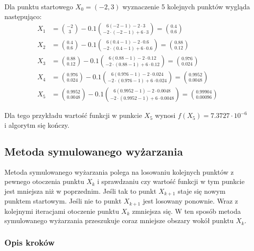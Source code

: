 \documentclass{article}
\begin{document}
Dla punktu startowego $X_0 = (-2, 3)$
wyznaczenie 5 kolejnych punktów wygląda następująco:
\begin{equation*}
    \begin{aligned}
    X_1 &= {{-2} \choose {3}} - 0.1 {6(-2 - 1)-2\cdot3 \choose -2\cdot(-2-1)+6\cdot3} = {{0.4} \choose {0.6}} \\
    X_2 &= {{0.4} \choose {0.6}} - 0.1 {6(0.4 - 1)-2\cdot0.6 \choose -2\cdot(0.4-1)+6\cdot0.6} = {{0.88} \choose {0.12}} \\
    X_3 &= {{0.88} \choose {0.12}} - 0.1 {6(0.88 - 1)-2\cdot0.12 \choose -2\cdot(0.88-1)+6\cdot0.12} = {{0.976} \choose {0.024}} \\
    X_4 &= {{0.976} \choose {0.024}} - 0.1 {6(0.976 - 1)-2\cdot0.024 \choose -2\cdot(0.976-1)+6\cdot0.024} = {{0.9952} \choose {0.0048}} \\
    X_5 &= {{0.9952} \choose {0.0048}} - 0.1 {6(0.9952 - 1)-2\cdot0.0048 \choose -2\cdot(0.9952-1)+6\cdot0.0048} = {{0.99904} \choose {0.00096}}
    \end{aligned}
\end{equation*}

Dla tego przykładu wartość funkcji w punkcie $X_5$ wynosi $f(X_5) = 7.3727 \cdot 10^{-6}$ i 
algorytm się kończy.

\subsection{Metoda symulowanego wyżarzania}
Metoda symulowanego wyżarzania polega na losowaniu kolejnych punktów
z pewnego otoczenia punktu $X_k$ i sprawdzaniu czy wartość funkcji
w tym punkcie jest mniejsza niż w poprzednim. Jeśli tak to punkt
$X_{k+1}$ staje się nowym punktem startowym. Jeśli nie to punkt
$X_{k+1}$ jest losowany ponownie. Wraz z kolejnymi iteracjami
otoczenie punktu $X_k$ zmniejsza się. W ten sposób metoda
symulowanego wyżarzania przeszukuje coraz mniejsze obszary
wokół punktu $X_k$.

\subsubsection{Opis kroków}
\end{document}
